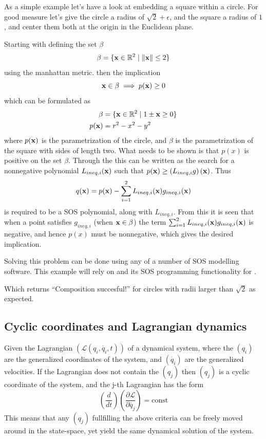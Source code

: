 \begin{example}

  As a simple example let's have a look at embedding a square within a circle.
  For good measure let's give the circle a radius of \(\sqrt{2}+\epsilon\), and
  the square a radius of \(1\), and center them both at the origin in the
  Euclidean plane.

  Starting with defining the set \(\beta\)
  \[
    \beta = \lbrace\mathbf{x} \in \mathbb{R}^2 \mid \lVert\mathbf{x}\rVert \leq 2\rbrace
  \]
  using the manhattan metric. then the implication
  \[
    \mathbf{x} \in \beta \implies p(\mathbf{x}) \geq 0
  \]
  which can be formulated as
  \begin{align*}
    \beta &= \lbrace\mathbf{x} \in \mathbb{R}^2 \mid 1 \pm \mathbf{x} \geq 0 \rbrace \\
    p(\mathbf{x}) &= r^2 - x^2 - y^2
  \end{align*}
  where \(p(\mathbf{x})\) is the parametrization of the circle, and \(\beta\) is
  the parametrization of the square with sides of length two. What needs to be
  shown is that \(p(x)\) is positive on the set \(\beta\). Through the
   this can be written as the search for a nonnegative
  polynomial \(L_{ineq,i}(\mathbf{x})\) such that \(p(\mathbf{x}) \geq \left(
    L_{ineq,i}g \right)(\mathbf{x})\). Thus
  \[
    q(\mathbf{x}) = p(\mathbf{x}) -
    \sum_{i=1}^{2}L_{ineq,i}(\mathbf{x})g_{ineq,i}(\mathbf{x})
  \]
  is required to be a \ac{SOS} polynomial, along with \(L_{ineq,i}\). From this
  it is seen that when a point satisfies \(g_{ineq,i}\) (\ie when \(\mathbf{x} \in
  \beta\)) the term \(\sum_{i=1}^{2}L_{ineq,i}(\mathbf{x})g_{ineq,i}(\mathbf{x})\)
  is negative, and hence \(p(x)\) must be nonnegative, which gives the desired
  implication.

  Solving this problem can be done using any of a number of \ac{SOS} modelling
  software. This example will rely on \cite[Yalmip]{Lofberg2004} and its
  \ac{SOS} programming functionality \cite{Lofberg2009} for \matlab.


  

  Which returns ``Composition succesful!'' for circles with radii larger than
  \(\sqrt{2}\) as expected.
\end{example}

\subsection{Cyclic coordinates and Lagrangian dynamics}
\label{subsec:cyclic-coordinates}

Given the Lagrangian \((\mathcal{L}(q_i, \dot{q_i}, t))\) of a dynamical system,
where the \((q_i)\) are the generalized coordinates of the system, and
\((\dot{q_i})\) are the generalized velocities. If the Lagrangian does not
contain the \((q_j)\) then \((q_j)\) is a cyclic coordinate of the system, and
the j-th Lagrangian has the form
\[
  \left( \frac{d}{dt} \right) \left( \frac{\partial \mathcal{L}}{\partial
      \dot{q_j}} \right) = \mathrm{const}
\]
This means that any \((q_j)\) fullfilling the above criteria can be freely moved
around in the state-space, yet yield the same dynamical solution of the system.


